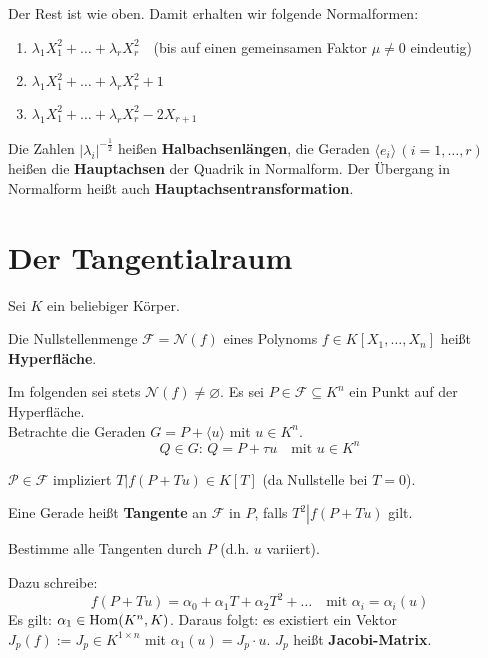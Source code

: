 \documentclass[parskip,a4paper,twoside,DIV15,BCOR12mm]{scrbook}
\begin{document}
Der Rest ist wie oben. Damit erhalten wir folgende Normalformen:
\begin{enumerate}
\item\(\lambda_{1}X_{1}^{2}+\ldots+\lambda_{r}X_{r}^{2}\quad\)(bis auf einen
gemeinsamen Faktor \(\mu\neq0\) eindeutig)
\item\(\lambda_{1}X_{1}^{2}+\ldots+\lambda_{r}X_{r}^{2}+1\)
\item\(\lambda_{1}X_{1}^{2}+\ldots+\lambda_{r}X_{r}^{2}-2X_{r+1}\)
\end{enumerate}
\begin{definition}
Die Zahlen \(\lvert\lambda_{i}\rvert^{-\frac{1}{2}}\) heißen 
\textbf{Halbachsenlängen}, die Geraden \(\langle e_{i}\rangle\,(i=1,\ldots,r)\)
heißen die \textbf{Hauptachsen} der Quadrik in Normalform.
Der Übergang in Normalform heißt auch \textbf{Hauptachsentransformation}.
\end{definition}

\section{Der Tangentialraum}
Sei \(K\) ein beliebiger Körper.
\begin{definition}
Die Nullstellenmenge \(\mathcal{F}=\mathcal{N}(f)\) eines Polynoms
\(f\in K[X_{1},\ldots,X_{n}]\) heißt \textbf{Hyperfläche}.
\end{definition}
Im folgenden sei stets \(\mathcal{N}(f)\neq\varnothing\). Es sei 
\(P\in\mathcal{F}\subseteq K^{n}\) ein Punkt auf der Hyperfläche.\\
Betrachte die Geraden \(G=P+\langle u\rangle\) mit  \(u\in K^{n}\).
\[
Q\in G:\,Q=P+\tau u\quad\text{mit }u\in K^{n}
\]
\begin{note}
\(\mathcal{P}\in\mathcal{F}\) impliziert \(\left.T\right|f(P+Tu)\in K[T]\) (da
Nullstelle bei \(T=0\)).
\end{note}
\begin{definition}
Eine Gerade heißt \textbf{Tangente} an \(\mathcal{F}\) in \(P\), falls
\(\left.T^{2}\right|f(P+Tu)\) gilt.
\end{definition}
\begin{ziel}
Bestimme alle Tangenten durch \(P\) (d.h. \(u\) variiert).
\end{ziel}
Dazu schreibe:
\[
f(P+Tu)=\alpha_{0}+\alpha_{1}T+\alpha_{2}T^{2}+\ldots
    \quad\text{mit }\alpha_{i}=\alpha_{i}(u)
\]
Es gilt: \(\alpha_{1}\in\operatorname{Hom}(K^{n},K)\). Daraus folgt: es existiert ein Vektor
\(J_{p}(f):=J_{p}\in K^{1\times n}\) mit \(\alpha_{1}(u)=J_{p}\cdot u\).
\(J_{p}\) heißt \textbf{Jacobi-Matrix}.
\end{document}
